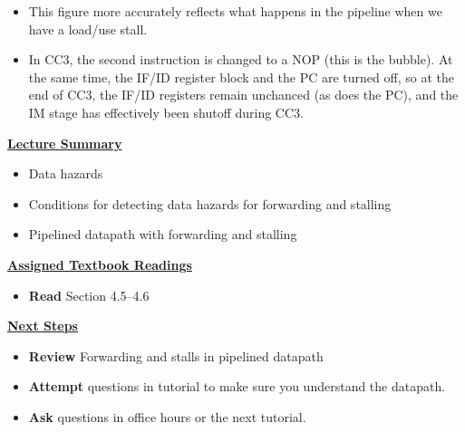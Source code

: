 \begin{frame}[fragile]
\BNotes\ifnum{}
\begin{itemize}
\item This figure more accurately reflects what happens in the pipeline
	when we have a load/use stall.
\item In CC3, the second instruction is changed to a NOP (this is the
	bubble).  At the same time, the IF/ID register block and the PC
	are turned off, so at the end of CC3, the IF/ID registers remain
	unchanced (as does the PC), and the IM stage has effectively
	been shutoff during CC3.  
\end{itemize}
\fi\ENotes
\end{frame}
  



\begin{frame}[fragile]
 \underline{\textbf{Lecture Summary}}
 \begin{itemize}
 \item Data hazards 
 \item Conditions for detecting data hazards for forwarding and stalling  
\item Pipelined datapath with forwarding and stalling 

\end{itemize}

 \underline{\textbf{Assigned Textbook Readings}}
\begin{itemize}
     \item \textbf{Read} Section 4.5--4.6 %
     \end{itemize}
    \underline{\textbf{Next Steps}}
    \begin{itemize}
     \item \textbf{Review} Forwarding and stalls in pipelined datapath
\item \textbf{Attempt} questions in tutorial to make sure you understand the datapath. 
    \item \textbf{Ask} questions in office hours or the next tutorial.
 \end{itemize}

\end{frame}



